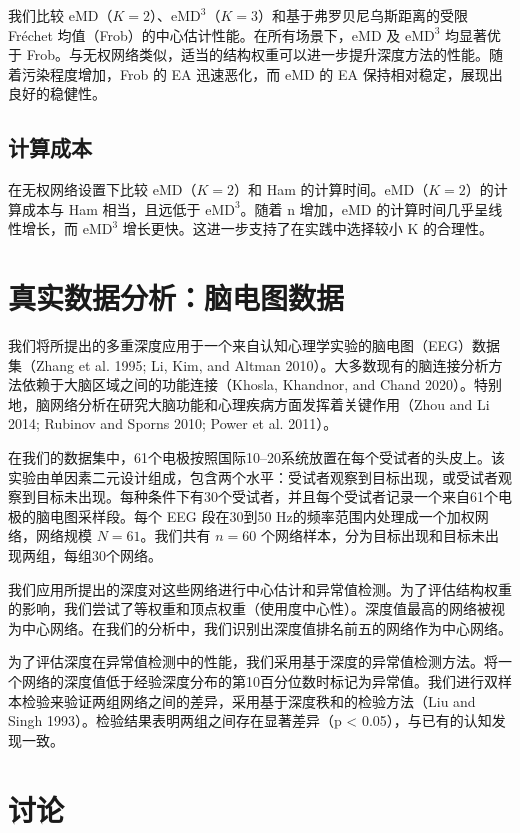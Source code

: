 \documentclass[
  10
]{article}
\begin{document}
我们比较 eMD（$K=2$）、$\mathrm{eMD}^3$（$K=3$）和基于弗罗贝尼乌斯距离的受限 Fréchet 均值（Frob）的中心估计性能。在所有场景下，eMD 及 $\mathrm{eMD}^3$ 均显著优于 Frob。与无权网络类似，适当的结构权重可以进一步提升深度方法的性能。随着污染程度增加，Frob 的 EA 迅速恶化，而 eMD 的 EA 保持相对稳定，展现出良好的稳健性。

\subsection{计算成本}

在无权网络设置下比较 eMD（$K=2$）和 Ham 的计算时间。eMD（$K=2$）的计算成本与 Ham 相当，且远低于 $\mathrm{eMD}^3$。随着 n 增加，eMD 的计算时间几乎呈线性增长，而 $\mathrm{eMD}^3$ 增长更快。这进一步支持了在实践中选择较小 K 的合理性。

\section{真实数据分析：脑电图数据}

我们将所提出的多重深度应用于一个来自认知心理学实验的脑电图（EEG）数据集（Zhang et al. 1995; Li, Kim, and Altman 2010）。大多数现有的脑连接分析方法依赖于大脑区域之间的功能连接（Khosla, Khandnor, and Chand 2020）。特别地，脑网络分析在研究大脑功能和心理疾病方面发挥着关键作用（Zhou and Li 2014; Rubinov and Sporns 2010; Power et al. 2011）。

在我们的数据集中，61个电极按照国际10–20系统放置在每个受试者的头皮上。该实验由单因素二元设计组成，包含两个水平：受试者观察到目标出现，或受试者观察到目标未出现。每种条件下有30个受试者，并且每个受试者记录一个来自61个电极的脑电图采样段。每个 EEG 段在30到50 Hz的频率范围内处理成一个加权网络，网络规模 $N=61$。我们共有 $n=60$ 个网络样本，分为目标出现和目标未出现两组，每组30个网络。

我们应用所提出的深度对这些网络进行中心估计和异常值检测。为了评估结构权重的影响，我们尝试了等权重和顶点权重（使用度中心性）。深度值最高的网络被视为中心网络。在我们的分析中，我们识别出深度值排名前五的网络作为中心网络。

为了评估深度在异常值检测中的性能，我们采用基于深度的异常值检测方法。将一个网络的深度值低于经验深度分布的第10百分位数时标记为异常值。我们进行双样本检验来验证两组网络之间的差异，采用基于深度秩和的检验方法（Liu and Singh 1993）。检验结果表明两组之间存在显著差异（p < 0.05），与已有的认知发现一致。

\section{讨论}
\end{document}
